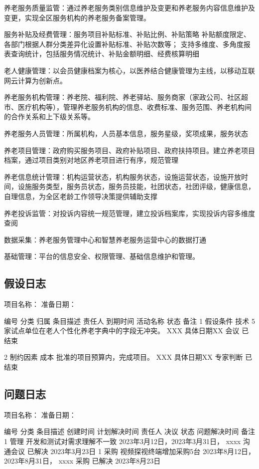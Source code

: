 \documentclass[UTF8]{../computerUniverse}
\begin{document}
养老服务质量监管：通过养老服务类别信息维护及变更和养老服务内容信息维护及变更，实现全区服务机构的养老服务备案管理。

服务补贴及经费管理：服务项目补贴标准、补贴比例、补贴策略
补贴额度限定、各部门根据人群分类差异化设置补贴标准、补贴次数等；
支持多维度、多角度报表查询统计，包括服务情况统计、补贴金额明细、经费核算明细

老人健康管理：以会员健康档案为核心，以医养结合健康管理为主线，以移动互联网云计算为创新点。

养老服务机构管理：养老院、福利院、养老驿站、服务商家（家政公司、社区超市、医疗机构等），管理养老服务机构的信息、收费标准、服务范围、养老机构间的合作关系和上下级关系等。


养老服务人员管理：所属机构，人员基本信息，服务星级，奖项成果，服务状态

养老项目管理：政府购买服务项目、政府补贴项目、政府扶持项目。建立养老项目档案，通过项目类别对地区养老项目进行有序，规范管理

养老信息统计管理：机构运营状态，机构服务状态，设施运营状态，设施开放时间，设施服务类型，服务员状态，服务员技能，社团状态，社团评级，健康信息，自理信息，为全区老龄工作领导决策提供辅助支撑

养老投诉监管：对投诉内容统一规范管理，建立投诉档案库，实现投诉内容多维度查阅

数据采集：养老服务管理中心和智慧养老服务运营中心的数据打通

基础管理：平台的信息安全、权限管理、基础信息维护和管理。






\subsection{假设日志}

项目名称：
准备日期：

编号    分类        归属    条目描述    责任人  到期时间    活动名称    状态    备注
1       假设条件    技术    5家试点单位在老人个性化养老字典中的字段无冲突。
XXX     具体日期XX    会议    已结束

2       制约因素    成本    批准的项目预算内，完成项目。
XXX     具体日期XX    专家判断    已结束


\subsection{问题日志}

项目名称：
准备日期：

编号    分类    条目描述    创建时间    计划解决时间     责任人   决议    状态  问题解决时间   备注
1       管理    开发和测试对需求理解不一致   2023年3月12日，2023年3月31日，    xxxx  沟通会议    已解决    2023年3月23日
1       采购    视频探视终端增加采购5台   2023年8月12日，2023年8月31日，    xxxx  采购    已解决    2023年8月23日
\end{document}

